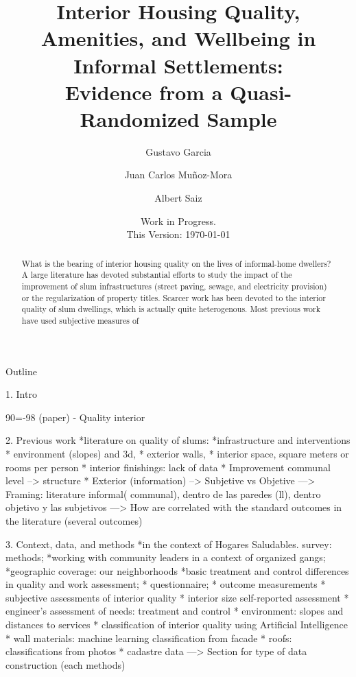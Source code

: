     

    \usepackage{booktabs}%
    \newcommand{\tabitem}{~~\llap{\textbullet}~~}

    \title{Interior Housing Quality, Amenities, and Wellbeing in Informal Settlements:  \\ 
    Evidence from a Quasi-Randomized Sample}
    
    \author[1]{Gustavo Garcia}
    \author[1]{Juan Carlos Muñoz-Mora}
    \author[2]{Albert Saiz}


    \date{Work in Progress. \\ This Version: \today}

\usepackage{graphicx}

   


    \maketitle
        \begin{abstract}
What is the bearing of interior housing quality on the lives of informal-home dwellers? A large literature has devoted substantial efforts to study the impact of the improvement of slum infrastructures (street paving, sewage, and electricity provision) or the regularization of property titles. Scarcer work has been devoted to the interior quality of slum dwellings, which is actually quite heterogenous. Most previous work have used subjective measures of 
        \end{abstract}

Outline

1. Intro

90=-98 (paper) - Quality interior

2. Previous work
*literature on quality of slums: 
*infrastructure and interventions
* environment (slopes) and 3d, 
* exterior walls, 
* interior space, square meters or rooms per person
* interior finishings: lack of data
* Improvement communal level --> structure
* Exterior (information) --> Subjetive vs Objetive
---> Framing: literature informal( communal), dentro de las paredes (ll), dentro objetivo y las subjetivos
---> How are correlated with the standard outcomes in the literature (several outcomes)

3. Context, data, and methods
*in the context of Hogares Saludables. survey: methods; 
*working with community leaders in a context of organized gangs; 
*geographic coverage: our neighborhoods
*basic treatment and control differences in quality and work assessment; 
* questionnaire;
* outcome measurements
* subjective assessments of interior quality
* interior size self-reported assessment
* engineer's assessment of needs: treatment and control
* environment: slopes and distances to services
* classification of interior quality using Artificial Intelligence
* wall materials: machine learning classification from facade
* roofs: classifications from photos
* cadastre data
---> Section for type of data construction (each methods)

